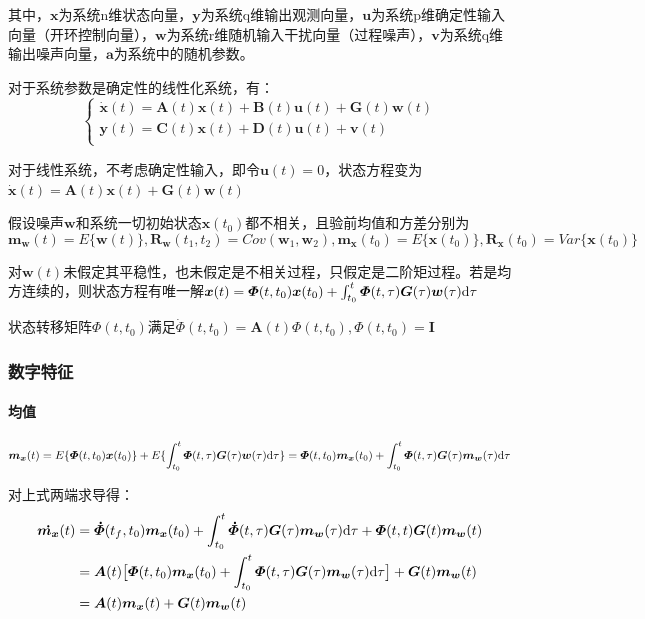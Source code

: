 \documentclass[11pt,a4paper]{ctexart}
\renewcommand{\d}{{\rm d}}
\begin{document}
            其中，$\bm{x}$为系统n维状态向量，$\bm{y}$为系统q维输出观测向量，$\bm{u}$为系统p维确定性输入向量（开环控制向量），$\bm{w}$为系统r维随机输入干扰向量（过程噪声），$\bm{v}$为系统q维输出噪声向量，$\bm{a}$为系统中的随机参数。

            对于系统参数是确定性的线性化系统，有：
            \[
            \begin{cases}
            \bm{\dot x}(t)=\bm{A}(t)\bm{x}(t)+\bm{B}(t)\bm{u}(t)+\bm{G}(t)\bm{w}(t)\\
            \bm{y}(t)=\bm{C}(t)\bm{x}(t)+\bm{D}(t)\bm{u}(t)+\bm{v}(t)\\
            \end{cases}
            \]

            对于线性系统，不考虑确定性输入，即令$\bm{u}(t)=0$，状态方程变为$\bm{\dot x}(t)=\bm{A}(t)\bm{x}(t)+\bm{G}(t)\bm{w}(t)$

            假设噪声$\bm{w}$和系统一切初始状态$\bm{x}(t_0)$都不相关，且验前均值和方差分别为
            \[
            \bm{m_w}(t)=E\{\bm{w}(t)\},\bm{R_w}(t_1,t_2)=Cov(\bm{w}_1,\bm{w}_2),\bm{m_x}(t_0)=E\{\bm{x}(t_0)\},\bm{R_x}(t_0)=Var\{\bm{x}(t_0)\}
            \]
            
            对$\bm{w}(t)$未假定其平稳性，也未假定是不相关过程，只假定是二阶矩过程。若是均方连续的，则状态方程有唯一解$\bm{x}(t)=\bm{\varPhi}(t,t_0)\bm{x}(t_0)+\int_{t_0}^{t}\bm{\varPhi}(t,\tau)\bm{G}(\tau)\bm{w}(\tau)\d\tau$

            状态转移矩阵$\bm{\varPhi}(t,t_0)$满足$\bm{\dot\varPhi}(t,t_0)=\bm{A}(t)\bm{\varPhi}(t,t_0),\bm{\varPhi}(t,t_0)=\bm{I}$
        \subsubsection{数字特征}
            \paragraph{均值}\leavevmode

            \[
            \bm{m_x}(t)=E\{\bm{\varPhi}(t,t_0)\bm{x}(t_0)\}+E\{\int_{t_0}^{t}\bm{\varPhi}(t,\tau)\bm{G}(\tau)\bm{w}(\tau)\d\tau\}=\bm{\varPhi}(t,t_0)\bm{m_x}(t_0)+\int_{t_0}^t\bm{\varPhi}(t,\tau)\bm{G}(\tau)\bm{m_w}(\tau)\d\tau
            \]

            对上式两端求导得：
            \begin{align*}
            \bm{\dot{m_x}}(t)&=\bm{\dot{\varPhi}}(t_f,t_0)\bm{m_x}(t_0)+\int_{t_0}^t\bm{\dot{\varPhi}}(t,\tau)\bm{G}(\tau)\bm{m_w}(\tau)\d\tau+\bm{\varPhi}(t,t)\bm{G}(t)\bm{m_w}(t)\\
            &=\bm{A}(t)\big[\bm{\varPhi}(t,t_0)\bm{m_x}(t_0)+\int_{t_0}^t\bm{\varPhi}(t,\tau)\bm{G}(\tau)\bm{m_w}(\tau)\d\tau\big]+\bm{G}(t)\bm{m_w}(t)\\
            &=\bm{A}(t)\bm{m_x}(t)+\bm{G}(t)\bm{m_w}(t)
            \end{align*}
\end{document}
